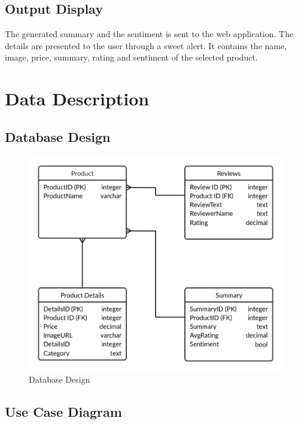 \documentclass[11pt]{report}
\begin{document}
\subsection{Output Display}
The generated summary and the sentiment is sent to the web application. The details are presented to the user through a sweet alert. It contains the name, image, price, summary, rating and sentiment of the selected product. 


\section{Data Description}
\subsection{Database Design}
\begin{figure}[H]
\centering
\includegraphics[scale=0.45]{DatabaseDesign.png}
\caption{Database Design}
\label{fig:fig}
\end{figure}

\newpage

\subsection{Use Case Diagram}
\end{document}
